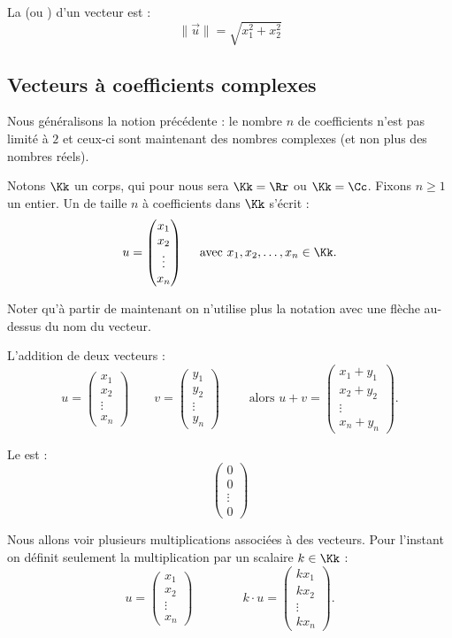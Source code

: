 \documentclass[11pt,class=report,crop=false]{standalone}
\begin{document}
La  (ou ) d'un vecteur est :
$$\| \vec u \| = \sqrt{x_1^2+x_2^2}$$



\subsection{Vecteurs à coefficients complexes}

Nous généralisons la notion précédente : le nombre $n$ de coefficients n'est pas limité à $2$ et ceux-ci sont maintenant des nombres complexes (et non plus des nombres réels). 

Notons $\Kk$ un corps, qui pour nous sera $\Kk=\Rr$ ou $\Kk=\Cc$.
Fixons $n\ge1$ un entier. 
Un  de taille $n$ à coefficients dans $\Kk$ s'écrit :
$$u = \begin{pmatrix}x_1\\x_2\\\vdots\\x_n\end{pmatrix} \quad \text{ avec } x_1,x_2,\ldots,x_n \in \Kk.$$

Noter qu'à partir de maintenant on n'utilise plus la notation avec une flèche au-dessus du nom du vecteur.

L'addition de deux vecteurs :
$$u = \begin{pmatrix}x_1\\x_2\\\vdots\\x_n\end{pmatrix} \qquad 
v = \begin{pmatrix}y_1\\y_2\\\vdots\\y_n\end{pmatrix}
 \qquad \text{ alors } u+v =\begin{pmatrix}x_1+y_1\\x_2+y_2\\\vdots\\x_n+y_n\end{pmatrix}.$$

Le  est :
$$\begin{pmatrix}0\\0\\\vdots\\0\end{pmatrix}$$

Nous allons voir plusieurs multiplications associées à des vecteurs.
Pour l'instant on définit seulement la multiplication par un scalaire $k\in\Kk$ :
$$u = \begin{pmatrix}x_1\\x_2\\\vdots\\x_n\end{pmatrix}
\qquad\qquad
k \cdot u = \begin{pmatrix}kx_1 \\ kx_2 \\\vdots \\kx_n\end{pmatrix}.$$ 
\end{document}

